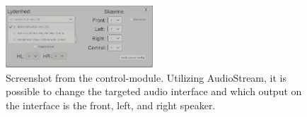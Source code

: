 \begin{figure}[h]
    \centering   
    \includegraphics[width = 0.49\textwidth]{SMC2022_template_Latex/images/14.12.2022_12.41.16_REC.png}
    \caption{Screenshot from the control-module. Utilizing AudioStream, it is possible to change the targeted audio interface and which output on the interface is the front, left, and right speaker.}
    \label{fig:audioInterface}
\end{figure}


